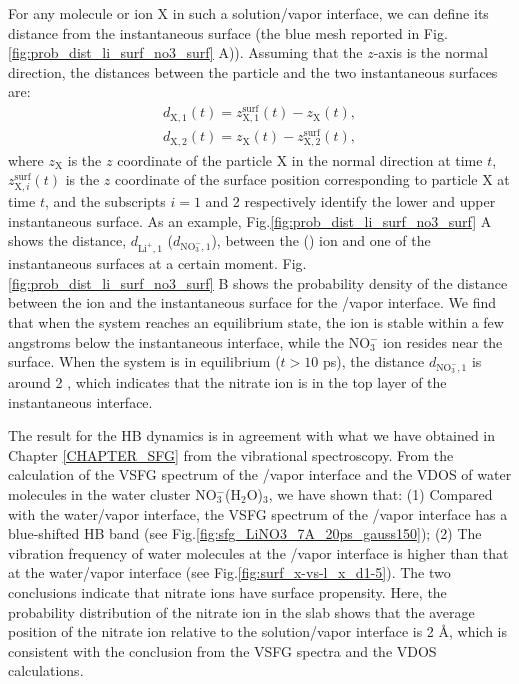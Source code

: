 For any molecule or ion X in such a solution/vapor interface, we can define its distance from the instantaneous surface 
(the blue mesh reported in Fig.\thinspace\ref{fig:prob_dist_li_surf_no3_surf} A)).
Assuming that the $z$-axis is the normal direction, the distances between the particle and the two instantaneous surfaces are:
%
\begin{eqnarray}
    d_{\text{X},1}(t)=  z^\text{surf}_{\text{X},1}(t) - z_{\text{X}}(t),\label{eq:distance_particle2surf_1}\\
    d_{\text{X},2}(t)= z_{\text{X}}(t) - z^\text{surf}_{\text{X},2}(t), 
\label{eq:distance_particle2surf_2}
\end{eqnarray}
%
where $z_{\text{X}}$ is the $z$ coordinate of the particle X in the normal direction at time $t$, 
$z^\text{surf}_{\text{X},i}(t)$ is the $z$ coordinate of the surface position corresponding to particle X at time $t$, 
and the subscripts $i=1$ and 2 respectively identify the lower and upper instantaneous surface.
As an example, Fig.\thinspace\ref{fig:prob_dist_li_surf_no3_surf} A shows the distance, 
$d_{\text{Li}^+,1}$ ($d_{\text{NO}_3^-,1}$), between the \Li (\nitrate) ion and one of the instantaneous surfaces at a certain moment.
Fig.\thinspace\ref{fig:prob_dist_li_surf_no3_surf} B shows the probability density of the distance between the ion 
and the instantaneous surface for the \LiN/vapor interface. We find that when the system reaches an equilibrium state, 
the \Li ion is stable within a few angstroms below the instantaneous interface, while the NO$^-_3$ ion resides near the surface. 
When the system is in equilibrium ($t>10$ ps), the distance $d_{\text{NO}_3^-,1}$ is around 2 \A, 
which indicates that the nitrate ion is in the top layer of the instantaneous interface. 

The result for the HB dynamics is in agreement with what we have obtained in Chapter \ref{CHAPTER_SFG}  
from the vibrational spectroscopy.
From the calculation of the VSFG spectrum of the \LiN/vapor interface and the VDOS of water molecules in the water cluster NO$^-_3$(H$_2$O)$_3$,
we have shown that: (1) Compared with the water/vapor interface, the VSFG spectrum of the \LiN/vapor interface has a blue-shifted HB band 
(see Fig.\thinspace\ref{fig:sfg_LiNO3_7A_20ps_gauss150});
(2) The vibration frequency of water molecules at the \LiN/vapor interface is higher than that at the water/vapor interface (see Fig.\thinspace\ref{fig:surf_x-vs-l_x_d1-5}).
The two conclusions indicate that nitrate ions have surface propensity. 
Here, the probability distribution of the nitrate ion in the slab shows that the average position of the nitrate ion relative to the solution/vapor interface is 2 \AA,
which is consistent with the conclusion from the VSFG spectra and the VDOS calculations.
%

